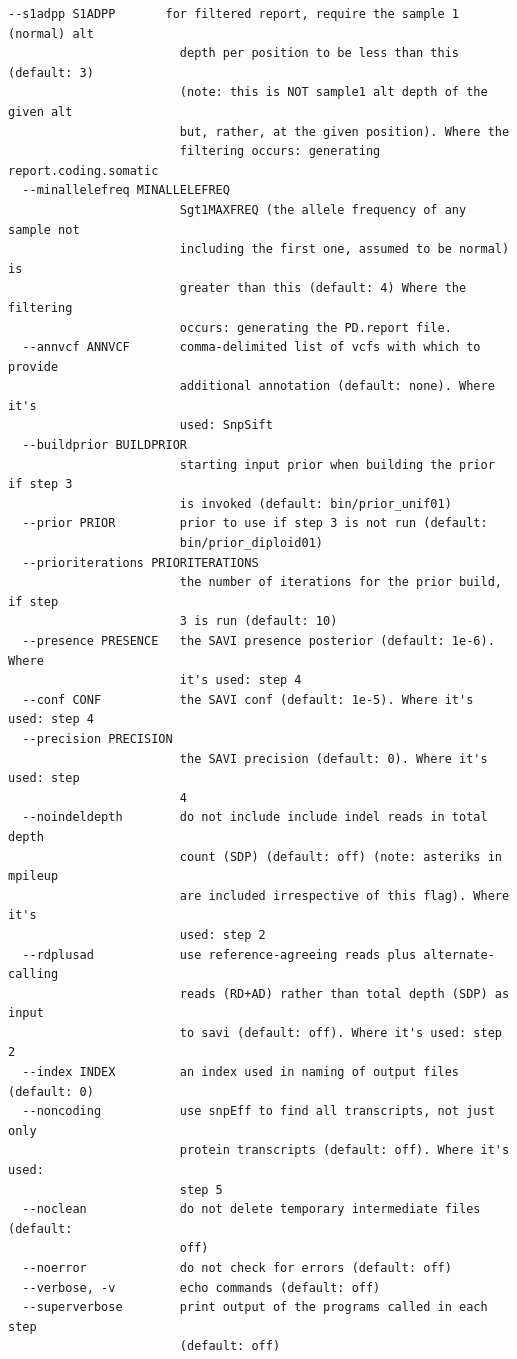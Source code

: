 \documentclass[letterpaper,14pt]{memoir}
\begin{document}
\begin{Verbatim}[fontsize=\small]
  --s1adpp S1ADPP       for filtered report, require the sample 1 (normal) alt
                        depth per position to be less than this (default: 3)
                        (note: this is NOT sample1 alt depth of the given alt
                        but, rather, at the given position). Where the
                        filtering occurs: generating report.coding.somatic
  --minallelefreq MINALLELEFREQ
                        Sgt1MAXFREQ (the allele frequency of any sample not
                        including the first one, assumed to be normal) is
                        greater than this (default: 4) Where the filtering
                        occurs: generating the PD.report file.
  --annvcf ANNVCF       comma-delimited list of vcfs with which to provide
                        additional annotation (default: none). Where it's
                        used: SnpSift
  --buildprior BUILDPRIOR
                        starting input prior when building the prior if step 3
                        is invoked (default: bin/prior_unif01)
  --prior PRIOR         prior to use if step 3 is not run (default:
                        bin/prior_diploid01)
  --prioriterations PRIORITERATIONS
                        the number of iterations for the prior build, if step
                        3 is run (default: 10)
  --presence PRESENCE   the SAVI presence posterior (default: 1e-6). Where
                        it's used: step 4
  --conf CONF           the SAVI conf (default: 1e-5). Where it's used: step 4
  --precision PRECISION
                        the SAVI precision (default: 0). Where it's used: step
                        4
  --noindeldepth        do not include include indel reads in total depth
                        count (SDP) (default: off) (note: asteriks in mpileup
                        are included irrespective of this flag). Where it's
                        used: step 2
  --rdplusad            use reference-agreeing reads plus alternate-calling
                        reads (RD+AD) rather than total depth (SDP) as input
                        to savi (default: off). Where it's used: step 2
  --index INDEX         an index used in naming of output files (default: 0)
  --noncoding           use snpEff to find all transcripts, not just only
                        protein transcripts (default: off). Where it's used:
                        step 5
  --noclean             do not delete temporary intermediate files (default:
                        off)
  --noerror             do not check for errors (default: off)
  --verbose, -v         echo commands (default: off)
  --superverbose        print output of the programs called in each step
                        (default: off)
\end{Verbatim}
\end{document}
